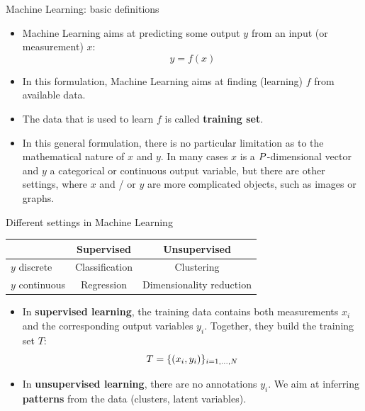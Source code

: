 \documentclass[xcolor=pdftex,dvipsnames,table]{beamer}
\begin{document}
\begin{frame}{Machine Learning: basic definitions}
\begin{itemize}
	\item Machine Learning aims at predicting some output $y$ from an input (or measurement) $x$:
	\begin{equation}
	y = f(x)
	\end{equation}
	\item In this formulation, Machine Learning aims at finding (learning) $f$ from available data.
	\item The data that is used to learn $f$ is called \textbf{training set}.
	\item In this general formulation, there is no particular limitation as to the mathematical nature of $x$ and $y$. In many cases $x$ is a $P$-dimensional vector and $y$ a categorical or continuous output variable, but there are other settings, where $x$ and / or $y$ are more complicated objects, such as images or graphs.
\end{itemize}
\end{frame}

\begin{frame}{Different settings in Machine Learning}
	\begin{table}
	\begin{tabular}{|l || c | c | }
		\hline
 		& Supervised & Unsupervised \\
		\hline \hline
		$y$ discrete & Classification & Clustering \\
		$y$ continuous & Regression & Dimensionality reduction\\
		\hline
	\end{tabular}
	\end{table}
\begin{itemize}
	\item In \textbf{supervised learning}, the training data contains both measurements $x_i$ and the corresponding output variables $y_i$. Together, they build the training set $T$:
	\begin{equation}
	T = \{(x_i, y_i)\}_{i=1, \ldots, N}
	\end{equation}
	\item In \textbf{unsupervised learning}, there are no annotations $y_i$. We aim at inferring \textbf{patterns} from the data (clusters, latent variables).
\end{itemize}
\end{frame}
\end{document}
